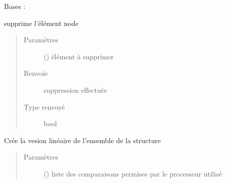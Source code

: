 \documentclass[letterpaper,10pt,french]{sphinxmanual}
\begin{document}
\begin{fulllineitems}
\label{\detokenize{structuresnodes:structuresnodes.StructureNodeList}}
Bases : {\hyperref[\detokenize{linkedlistnode:linkedlistnode.LinkedList}]{}}

\begin{fulllineitems}
\label{\detokenize{structuresnodes:structuresnodes.StructureNodeList.delete}}
supprime l’élément node
\begin{quote}\begin{description}
\item[{Paramètres}] \leavevmode
{} ({\hyperref[\detokenize{linkedlistnode:linkedlistnode.LinkedListNode}]{}}) \textendash{} élément à supprimer

\item[{Renvoie}] \leavevmode
suppression effectuée

\item[{Type renvoyé}] \leavevmode
bool

\end{description}\end{quote}

\end{fulllineitems}


\begin{fulllineitems}
\label{\detokenize{structuresnodes:structuresnodes.StructureNodeList.linearize}}
Crée la vesion linéaire de l’ensemble de la structure
\begin{quote}\begin{description}
\item[{Paramètres}] \leavevmode
{} (\sphinxstyleliteralemphasis{\sphinxupquote{{[}}}\sphinxstyleliteralemphasis{\sphinxupquote{{]}}}) \textendash{} liste des comparaisons permises par le processeur utilisé


\end{description}
\end{quote}
\end{fulllineitems}
\end{fulllineitems}
\end{document}
